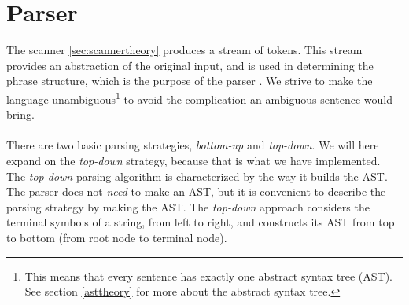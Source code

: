 \section{Parser}
\label{sec:parser}
The scanner \ref{sec:scannertheory} produces a stream of tokens. This stream provides an abstraction of the original input, and is used in determining the phrase structure, which is the purpose of the parser \cite{misc:spo}. We strive to make the language unambiguous\footnote{This means that every sentence has exactly one abstract syntax tree (AST). See section \ref{asttheory} for more about the abstract syntax tree.} to avoid the complication an ambiguous sentence would bring.\\
\\
There are two basic parsing strategies, \textit{bottom-up} and \textit{top-down}. We will here expand on the \textit{top-down} strategy, because that is what we have implemented.\\ \indent
The \textit{top-down} parsing algorithm is characterized by the way it builds the AST. The parser does not \textit{need} to make an AST, but it is convenient to describe the parsing strategy by making the AST. The \textit{top-down} approach considers the terminal symbols of a string, from left to right, and constructs its AST from top to bottom (from root node to terminal node).